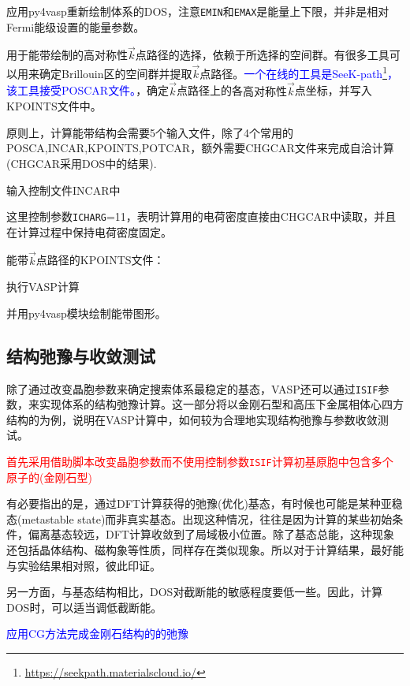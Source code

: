 应用\textrm{py4vasp}重新绘制体系的\textrm{DOS}，注意\texttt{EMIN}和\texttt{EMAX}是能量上下限，并非是相对\textrm{Fermi}能级设置的能量参数。

用于能带绘制的高对称性$\vec k$点路径的选择，依赖于所选择的空间群。有很多工具可以用来确定\textrm{Brillouin}区的空间群并提取$\vec k$点路径。\textcolor{blue}{一个在线的工具是\textrm{SeeK-path}\footnote{\url{https://seekpath.materialscloud.io/}}，该工具接受\textrm{POSCAR}文件。}，确定$\vec k$点路径上的各$高对称性\vec k$点坐标，并写入\textrm{KPOINTS}文件中。

原则上，计算能带结构会需要5个输入文件，除了4个常用的\textrm{POSCA,INCAR,KPOINTS,POTCAR}，额外需要\textrm{CHGCAR}文件来完成自洽计算(\textrm{CHGCAR}采用\textrm{DOS}中的结果).

输入控制文件\textrm{INCAR}中

这里控制参数\texttt{ICHARG}=11，表明计算用的电荷密度直接由\textrm{CHGCAR}中读取，并且在计算过程中保持电荷密度固定。

能带$\vec k$点路径的\textrm{KPOINTS}文件：

执行\textrm{VASP}计算

并用\textrm{py4vasp}模块绘制能带图形。

\subsection{结构弛豫与收敛测试}
除了通过改变晶胞参数来确定搜索体系最稳定的基态，\textrm{VASP}还可以通过\texttt{ISIF}参数，来实现体系的结构弛豫计算。这一部分将以金刚石型和高压下金属相体心四方结构的为例，说明在\textrm{VASP}计算中，如何较为合理地实现结构弛豫与参数收敛测试。

\textcolor{red}{首先采用借助脚本改变晶胞参数而不使用控制参数\texttt{ISIF}计算初基原胞中包含多个原子的(金刚石型)}

有必要指出的是，通过\textrm{DFT}计算获得的弛豫(优化)基态，有时候也可能是某种亚稳态\textrm{(metastable state)}而非真实基态。出现这种情况，往往是因为计算的某些初始条件，偏离基态较远，\textrm{DFT}计算收敛到了局域极小位置。除了基态总能，这种现象还包括晶体结构、磁构象等性质，同样存在类似现象。所以对于计算结果，最好能与实验结果相对照，彼此印证。

另一方面，与基态结构相比，\textrm{DOS}对截断能的敏感程度要低一些。因此，计算\textrm{DOS}时，可以适当调低截断能。

\textcolor{blue}{应用\textrm{CG}方法完成金刚石结构的的弛豫}

